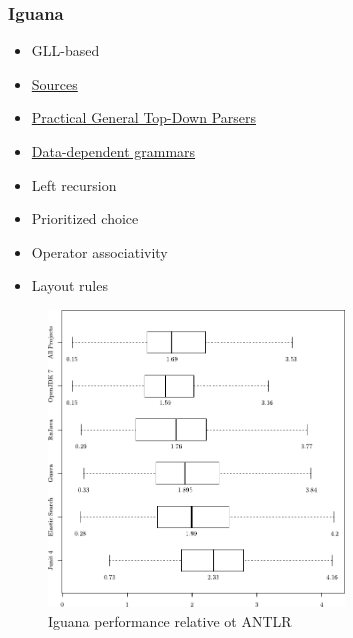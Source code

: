 \documentclass[xcolor=table,aspectratio=169]{beamer}
\begin{document}
\begin{frame}[fragile]
  \frametitle{Iguana}
  \begin{minipage}[t]{0.48\textwidth}
    
  
    \begin{itemize}
      \item GLL-based
      \item \href{https://github.com/iguana-parser/iguana}{Sources}
      \item \href{https://www.cwi.nl/nieuws/2019/thesis_final-1.pdf}{Practical General Top-Down Parsers}
      \item[\faPlus] \href{Semantics and Algorithms for Data-dependent Grammars}{Data-dependent grammars}
      \item[\faPlus] Left recursion
      \item[\faPlus] Prioritized choice
      \item[\faPlus] Operator associativity 
      \item[\faPlus] Layout rules    
    \end{itemize}  
  \end{minipage}  
  \begin{minipage}[t]{0.48\textwidth}
    \begin{figure}
      \includegraphics[width=0.7\textwidth]{pictures/IguanaPerformance.pdf}
      \caption{Iguana performance relative ot ANTLR\footnotemark}
    \end{figure}
  \end{minipage}
\end{frame}
\end{document}
